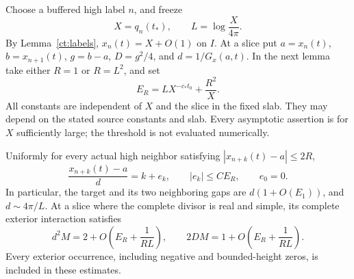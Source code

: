 Choose a buffered high label $n$, and freeze
\begin{equation}
 X=q_n(t_*),\qquad L=\log\frac{X}{4\pi}.
 \label{ct:scale}
\end{equation}
By Lemma~\ref{ct:labels}, $x_n(t)=X+O(1)$ on $I$. At a slice put
$a=x_n(t)$, $b=x_{n+1}(t)$, $g=b-a$, $D=g^2/4$, and
$d=1/G_x(a,t)$. In the next lemma take either $R=1$ or $R=L^2$, and set
\begin{equation}
 E_R=LX^{-c_*t_0}+\frac{R^2}{X}.
 \label{ct:window-error}
\end{equation}
All constants are independent of $X$ and the slice in the fixed slab.
They may depend on the stated source constants and slab. Every
asymptotic assertion is for $X$ sufficiently large; the threshold is
not evaluated numerically.

\begin{lemma}
\label{ct:head-tail}
Uniformly for every actual high neighbor satisfying
$|x_{n+k}(t)-a|\le2R$,
\begin{equation}
 \frac{x_{n+k}(t)-a}{d}=k+e_k,
 \qquad |e_k|\le C E_R,
 \qquad e_0=0.
 \label{ct:normalized-position}
\end{equation}
In particular, the target and its two neighboring gaps are
$d(1+O(E_1))$, and $d\sim4\pi/L$.
At a slice where the complete divisor is real and simple, its complete
exterior interaction satisfies
\begin{equation}
 d^2M=2+O\left(E_R+\frac1{RL}\right),\qquad
 2DM=1+O\left(E_R+\frac1{RL}\right).
 \label{ct:complete-mass}
\end{equation}
Every exterior occurrence, including negative and bounded-height zeros,
is included in these estimates.
\end{lemma}

